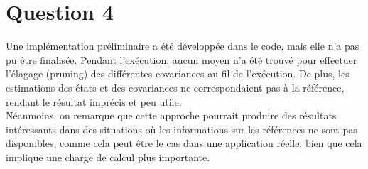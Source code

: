 \documentclass[../CSC_5RO12_TA_TP4.tex]{subfiles}
\begin{document}
\section{Question 4}
\noindent Une implémentation préliminaire a été développée dans le code, mais elle n'a pas pu être finalisée. Pendant l'exécution, aucun moyen n'a été trouvé pour effectuer l'élagage (pruning) des différentes covariances au fil de l'exécution. De plus, les estimations des états et des covariances ne correspondaient pas à la référence, rendant le résultat imprécis et peu utile.\\

\noindent Néanmoins, on remarque que cette approche pourrait produire des résultats intéressants dans des situations où les informations sur les références ne sont pas disponibles, comme cela peut être le cas dans une application réelle, bien que cela implique une charge de calcul plus importante.
\end{document}
